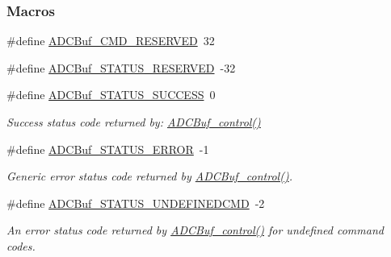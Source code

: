 \subsubsection*{Macros}
\begin{DoxyCompactItemize}
\item 
\#define \hyperlink{_a_d_c_buf_8h_a6d889e191027535ad318be0b9c3765d1}{A\+D\+C\+Buf\+\_\+\+C\+M\+D\+\_\+\+R\+E\+S\+E\+R\+V\+E\+D}~32
\item 
\#define \hyperlink{_a_d_c_buf_8h_a61f0abe91c78f6ab7003c53e513d4d3b}{A\+D\+C\+Buf\+\_\+\+S\+T\+A\+T\+U\+S\+\_\+\+R\+E\+S\+E\+R\+V\+E\+D}~-\/32
\item 
\#define \hyperlink{_a_d_c_buf_8h_ac9c96db575dfaa6bcdfbd94cd875fbd4}{A\+D\+C\+Buf\+\_\+\+S\+T\+A\+T\+U\+S\+\_\+\+S\+U\+C\+C\+E\+S\+S}~0
\begin{DoxyCompactList}\small\item\em Success status code returned by\+: \hyperlink{_a_d_c_buf_8h_a9b9765fb0ac57dee9df234a79dcd5aea}{A\+D\+C\+Buf\+\_\+control()} \end{DoxyCompactList}\item 
\#define \hyperlink{_a_d_c_buf_8h_a78f1a705377b5bb15cc6c152f75846e2}{A\+D\+C\+Buf\+\_\+\+S\+T\+A\+T\+U\+S\+\_\+\+E\+R\+R\+O\+R}~-\/1
\begin{DoxyCompactList}\small\item\em Generic error status code returned by \hyperlink{_a_d_c_buf_8h_a9b9765fb0ac57dee9df234a79dcd5aea}{A\+D\+C\+Buf\+\_\+control()}. \end{DoxyCompactList}\item 
\#define \hyperlink{_a_d_c_buf_8h_a5d552a66f63d36a8eaffd53c9deff2f2}{A\+D\+C\+Buf\+\_\+\+S\+T\+A\+T\+U\+S\+\_\+\+U\+N\+D\+E\+F\+I\+N\+E\+D\+C\+M\+D}~-\/2
\begin{DoxyCompactList}\small\item\em An error status code returned by \hyperlink{_a_d_c_buf_8h_a9b9765fb0ac57dee9df234a79dcd5aea}{A\+D\+C\+Buf\+\_\+control()} for undefined command codes. \end{DoxyCompactList}\end{DoxyCompactItemize}
